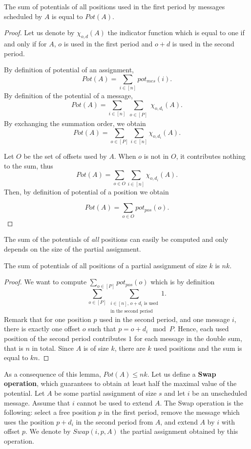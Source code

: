 \documentclass[pdflatex,sn-mathphys,iicol]{sn-jnl}%
\theoremstyle{thmstyleone}%
\theoremstyle{thmstyletwo}%
\theoremstyle{thmstylethree}%
\begin{document}
\begin{lemma}\label{lemma:pot_pos}
The sum of potentials of all positions used in the first period by messages scheduled by $A$ is equal to $Pot(A)$.  
\end{lemma}
\begin{proof}
 Let us denote by $\chi_{o,d}(A)$ the indicator function which is equal to one if and only if for $A$, $o$ is used in the first period and $o+d$ is used in the second period.

By definition of potential of an assignment, 
$$Pot(A) = \sum_{i \in [n]} pot_{mes}(i).$$
By definition of the potential of a message, 
$$\displaystyle{Pot(A) = \sum_{i \in [n]} \sum_{\substack{o \in [P]}} \chi_{o,d_i}(A) }.$$
By exchanging the summation order, we obtain
$$\displaystyle{Pot(A) = \sum_{o \in [P] }\sum_{i \in [n]} \chi_{o,d_i}(A)}.$$

Let $O$ be the set of offsets used by $A$.
When $o$ is not in $O$, it contributes nothing to the sum, thus
$$\displaystyle{Pot(A) = \sum_{o \in O} \sum_{i \in [n]} \chi_{o,d_i}(A) }.$$
Then, by definition of potential of a position we obtain

$$\displaystyle{Pot(A) = \sum_{o \in O} pot_{pos}(o)}.$$
\end{proof}

The sum of the potentials of \emph{all} positions can easily be computed and only depends on the size of the partial assignment.

\begin{lemma}\label{lemma:inv}
The sum of potentials of all positions of a partial assignment of size $k$ is $nk$.  
\end{lemma}
\begin{proof}
We want to compute $\sum_{o \in [P]} pot_{pos}(o)$ which is by definition
$$\sum_{o \in [P]} \sum_{\substack {i \in [n],\, o + d_i \text{ is used} \\ \text{in the second period}}} 1.$$
Remark that for one position $p$ used in the second period, and one message $i$, there is exactly one offset $o$ such that $p = o+d_i \mod P$.
Hence, each used position of the second period contributes $1$ for each message in the double sum, that is $n$ in total.
Since $A$ is of size $k$, there are $k$ used positions and the sum is equal to $kn$.
\end{proof}

 As a consequence of this lemma, $Pot(A) \leq nk$. Let us define a \textbf{Swap operation}, which guarantees to obtain at least half the maximal value of the potential. Let $A$ be some partial assignment of size $s$ and let $i$ be an unscheduled message. Assume that $i$ cannot be used to extend $A$. The Swap operation is the following: 
select a free position $p$ in the first period, remove the message which uses the position $p+d_i$ in the second period from $A$, and extend $A$ by $i$ with offset $p$. We denote by $Swap(i,p,A)$ the partial assignment obtained by this operation.
\end{document}
